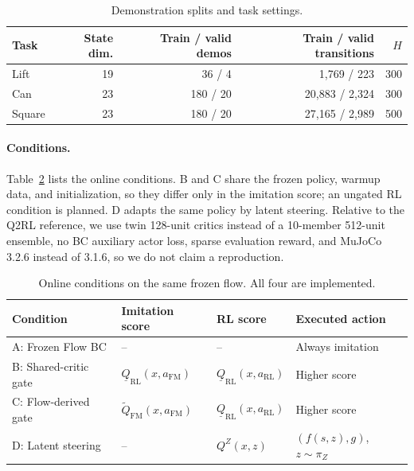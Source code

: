 \documentclass[10pt]{article}
\newcommand{\QRLlow}{\underline{Q}_{\mathrm{RL}}}
\newcommand{\QFM}{\tilde{Q}_{\mathrm{FM}}}
\begin{document}
\begin{table}[t]
  \centering\small
  \caption{Demonstration splits and task settings.}
  \label{tab:splits}
  \begin{tabular}{lrrrr}
    \toprule
    Task & State dim. & Train / valid demos & Train / valid transitions & $H$ \\
    \midrule
    Lift   & 19 & 36 / 4   & 1{,}769 / 223     & 300 \\
    Can    & 23 & 180 / 20 & 20{,}883 / 2{,}324 & 300 \\
    Square & 23 & 180 / 20 & 27{,}165 / 2{,}989 & 500 \\
    \bottomrule
  \end{tabular}
\end{table}

\paragraph{Conditions.}
Table~\ref{tab:conditions} lists the online conditions. B and C share the frozen
policy, warmup data, and initialization, so they differ only in the imitation
score; an ungated RL condition is planned. D adapts the same policy by latent
steering. Relative to the Q2RL reference, we use twin 128-unit critics instead
of a 10-member 512-unit ensemble, no BC auxiliary actor loss, sparse evaluation
reward, and MuJoCo 3.2.6 instead of 3.1.6, so we do not claim a reproduction.

\begin{table}[t]
  \centering\small
  \caption{Online conditions on the same frozen flow. All four are implemented.}
  \label{tab:conditions}
  \begin{tabular}{llll}
    \toprule
    Condition & Imitation score & RL score & Executed action \\
    \midrule
    A: Frozen Flow BC      & --                              & --                              & Always imitation \\
    B: Shared-critic gate  & $\QRLlow(x,a_{\mathrm{FM}})$    & $\QRLlow(x,a_{\mathrm{RL}})$    & Higher score \\
    C: Flow-derived gate   & $\QFM(x,a_{\mathrm{FM}})$       & $\QRLlow(x,a_{\mathrm{RL}})$    & Higher score \\
    D: Latent steering     & --                              & $Q^Z(x,z)$                      & $(f(s,z),g)$, $z\sim\pi_Z$ \\
    \bottomrule
  \end{tabular}
\end{table}
\end{document}
